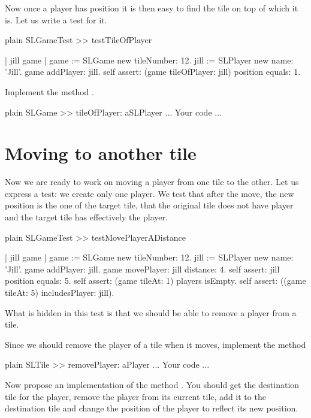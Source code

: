 \documentclass[10pt,twoside,english]{_support/latex/sbabook/sbabook}
\begin{document}
Now once a player has position it is then easy to find the tile on top of which it is.
Let us write a test for it. 

\begin{displaycode}{plain}
SLGameTest >> testTileOfPlayer
	
	| jill game |
	game := SLGame new tileNumber: 12.
	jill := SLPlayer new name: 'Jill'.
	game addPlayer: jill. 
	self assert: (game tileOfPlayer: jill) position equals: 1.
\end{displaycode}

Implement the method .

\begin{displaycode}{plain}
SLGame >> tileOfPlayer: aSLPlayer 
	... Your code ...
\end{displaycode}
\section{Moving to another tile}
Now we are ready to work on moving a player from one tile to the other. 
Let us express a test: we create only one player. We test that after the move,  the new position is the one of the target tile, that the original tile does not have player and the target tile has effectively the player.

\begin{displaycode}{plain}
SLGameTest >> testMovePlayerADistance
	
	| jill game |
	game := SLGame new tileNumber: 12.
	jill := SLPlayer new name: 'Jill'.
	game addPlayer: jill. 
	game movePlayer: jill distance: 4.
	self assert: jill position equals: 5.
	self assert: (game tileAt: 1) players isEmpty.
	self assert: ((game tileAt: 5) includesPlayer: jill).
\end{displaycode}

What is hidden in this test is that we should be able to remove a player from a tile.

Since we should remove the player of a tile when it moves, implement the method

\begin{displaycode}{plain}
SLTile >> removePlayer: aPlayer
	... Your code ...
\end{displaycode}

Now propose an implementation of the method .
You should get the destination tile for the player, remove the player from its current tile, add it to the destination tile and change the position of the player to reflect its new position.
\end{document}

